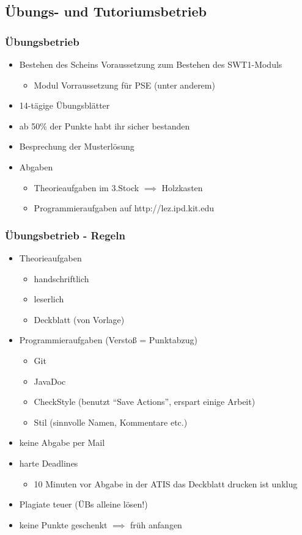\documentclass[18pt]{beamer}
\begin{document}
	\subsection{Übungs- und Tutoriumsbetrieb}
		\begin{frame}
			\frametitle{Übungsbetrieb}
			\begin{itemize}
				\item Bestehen des Scheins Voraussetzung zum Bestehen des SWT1-Moduls 
				\begin{itemize}
					\item Modul Vorraussetzung für PSE (unter anderem)
				\end{itemize}
				\item 14-tägige Übungsblätter 
				\item ab 50\% der Punkte habt ihr sicher bestanden
				\item Besprechung der Musterlösung
				\item Abgaben
					\begin{itemize}
						\item Theorieaufgaben im 3.Stock $\implies$ Holzkasten
						\item Programmieraufgaben auf http://lez.ipd.kit.edu 
					\end{itemize}
			\end{itemize}
		\end{frame}
	
	\begin{frame}
		\frametitle{Übungsbetrieb - Regeln}
		\begin{itemize}
			\item Theorieaufgaben 
			\begin{itemize}
				\item handschriftlich
				\item leserlich
				\item Deckblatt (von Vorlage)
			\end{itemize}
			\pause
			\item Programmieraufgaben (Verstoß = Punktabzug)
			\begin{itemize}
				\item Git
				\item JavaDoc
				\item CheckStyle (benutzt \enquote{Save Actions}, erspart einige Arbeit)
				\item Stil (sinnvolle Namen, Kommentare etc.)
			\end{itemize}
			\pause
			\item keine Abgabe per Mail \pause
			\item harte Deadlines
			\begin{itemize}
				\item 10 Minuten vor Abgabe in der ATIS das Deckblatt drucken ist unklug\pause
			\end{itemize} 
			\item Plagiate teuer (ÜBs alleine lösen!) \pause
			\item keine Punkte geschenkt $\implies$ früh anfangen
		\end{itemize}
	\end{frame}
		
\end{document}
